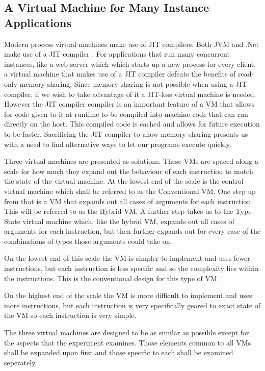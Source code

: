 \documentclass[english,a4paper]{article}
\begin{document}
\subsection{A Virtual Machine for Many Instance Applications}
Modern process virtual machines make use of JIT compilers. Both JVM
and .Net make use of a JIT compiler \cite{MSDN,Oracle}. For
applications that run many concurrent instances, like a web server
which which starts up a new process for every client, a virtual
machine that makes use of a JIT compiler defeats the benefits of
read-only memory sharing. Since memory sharing is not possible when
using a JIT compiler, if we wish to take advantage of it a JIT-less
virtual machine is needed. However the JIT compiler compiler is an
important feature of a VM that allows for code given to it at runtime
to be compiled into machine code that can run directly on the
host. This compiled code is cached and allows for future execution to
be faster. Sacrificing the JIT compiler to allow memory sharing
presents us with a need to find alternative ways to let our programs
execute quickly.

Three virtual machines are presented as solutions. These VMs are
spaced along a scale for how much they expand out the behaviour of
each instruction to match the state of the virtual machine. At the
lowest end of the scale is the control virtual machine which shall be
referred to as the Conventional VM. One step up from that is a VM that
expands out all cases of arguments for each instruction. This will be
referred to as the Hybrid VM. A further step takes us to the
Type-State virtual machine which, like the hybrid VM, expands out all
cases of arguments for each instruction, but then further expands out
for every case of the combinations of types those arguments could take
on.

On the lowest end of this scale the VM is simpler to implement and
uses fewer instructions, but each instruction is less specific and so
the complexity lies within the instructions. This is the conventional
design for this type of VM.

On the highest end of the scale the VM is more difficult to implement
and uses more instructions, but each instruction is very specifically
geared to exact state of the VM so each instruction is very simple.

The three virtual machines are designed to be as similar as possible
except for the aspects that the experiment examines. Those elements
common to all VMs shall be expanded upon first and those specific to
each shall be examined seperately.
\end{document}
